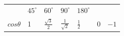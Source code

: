 {\begin{center}
\begin{xtabular*}{\mytablewidth}[t]{|p{10\mystarwidth}|p{10\mystarwidth}|p{10\mystarwidth}|p{10\mystarwidth}|p{10\mystarwidth}|p{10\mystarwidth}|p{10\mystarwidth}|}
                 &
                  ${45}^{\circ }$
                 &
                  ${60}^{\circ }$
                 &
                  ${90}^{\circ }$
                 &
                  ${180}^{\circ }$
     \tabularnewline{}
                  $cos\theta $
                 &
        1 &
                  $\frac{\sqrt{3}}{2}$
                 &
                  $\frac{1}{\sqrt{2}}$
                 &
                  $\frac{1}{2}$
                 &
        0 &
                  $-1$

\end{xtabular*}
\end{center}}
